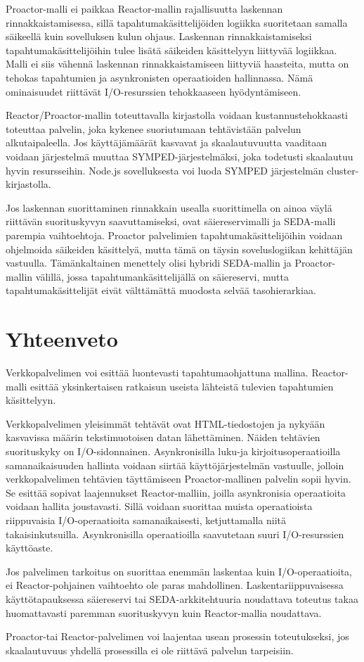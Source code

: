 \documentclass[finnish]{tktltiki2}
\theoremstyle{definition}
\theoremstyle{remark}
\begin{document}
Proactor-malli ei paikkaa
Reactor-mallin rajallisuutta laskennan rinnakkaistamisessa,
sillä tapahtumakäsittelijöiden logiikka suoritetaan
samalla säikeellä kuin sovelluksen kulun ohjaus.
Laskennan rinnakkaistamiseksi tapahtumakäsittelijöihin
tulee lisätä säikeiden käsittelyyn liittyvää logiikkaa.
Malli ei siis vähennä laskennan rinnakkaistamiseen liittyviä
haasteita, mutta on tehokas tapahtumien ja asynkronisten
operaatioiden hallinnassa. Nämä ominaisuudet riittävät
I/O-resurssien tehokkaaseen hyödyntämiseen.

Reactor/Proactor-mallin toteuttavalla
kirjastolla voidaan kustannustehokkaasti
toteuttaa palvelin, joka kykenee suoriutumaan
tehtävistään palvelun alkutaipaleella. Jos
käyttäjämäärät kasvavat ja skaalautuvuutta
vaaditaan voidaan järjestelmä muuttaa SYMPED-järjestelmäksi,
joka todetusti skaalautuu hyvin resursseihin.
Node.js sovelluksesta voi luoda SYMPED järjestelmän
cluster-kirjastolla.

Jos laskennan suorittaminen rinnakkain usealla suorittimella
on ainoa väylä riittävän suorituskyvyn saavuttamiseksi,
ovat säiereservimalli ja SEDA-malli parempia vaihtoehtoja.
Proactor palvelimien tapahtumakäsittelijöihin
voidaan ohjelmoida säikeiden käsittelyä, mutta tämä
on täysin soveluslogiikan kehittäjän vastuulla.
Tämänkaltainen menettely olisi hybridi
SEDA-mallin ja Proactor-mallin välillä, jossa
tapahtumankäsittelijällä on säiereservi, mutta tapahtumakäsittelijät
eivät välttämättä muodosta selvää tasohierarkiaa.

\section{Yhteenveto}\label{sec:yhteenveto}

Verkkopalvelimen voi esittää luontevasti
tapahtumaohjattuna mallina. Reactor-malli esittää yksinkertaisen
ratkaisun useista lähteistä tulevien tapahtumien käsittelyyn.

Verkkopalvelimen yleisimmät tehtävät ovat
HTML-tiedostojen ja nykyään kasvavissa määrin
tekstimuotoisen datan lähettäminen.
Näiden tehtävien suorituskyky on
I/O-sidonnainen.
Asynkronisilla luku-ja kirjoitusoperaatioilla samanaikaisuuden hallinta
voidaan siirtää käyttöjärjestelmän vastuulle, jolloin
verkkopalvelimen tehtävien täyttämiseen Proactor-mallinen
palvelin sopii hyvin.
Se esittää sopivat laajennukset Reactor-malliin, joilla
asynkronisia operaatioita voidaan hallita joustavasti.
Sillä voidaan suorittaa muista operaatioista riippuvaisia I/O-operaatioita
samanaikaisesti, ketjuttamalla niitä takaisinkutsuilla.
Asynkronisilla operaatioilla saavutetaan suuri I/O-resurssien
käyttöaste.

Jos palvelimen tarkoitus on suorittaa enemmän laskentaa kuin
I/O-operaatioita, ei Reactor-pohjainen vaihtoehto ole paras mahdollinen.
Laskentariippuvaisessa käyttötapauksessa säiereservi tai SEDA-arkkitehtuuria
noudattava toteutus takaa huomattavasti paremman suorituskyvyn kuin
Reactor-mallia noudattava.

Proactor-tai Reactor-palvelimen voi laajentaa
usean prosessin toteutukseksi, jos skaalautuvuus
yhdellä prosessilla ei ole riittävä palvelun tarpeisiin.




\end{document}
